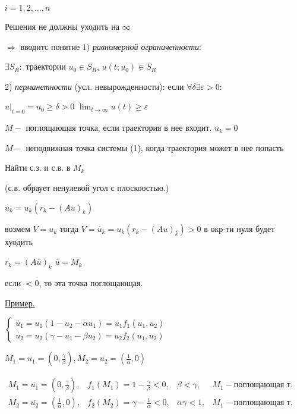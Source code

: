 \documentclass{article}
\begin{document}
\begin{large}
\(
i = 1,2,...,n
\)

\vspace{0.5cm}
Решения не должны уходить на $\infty$ 

$\Rightarrow$ вводитс понятие $1)$ \textit{равномерной ограниченности}:

$\exists S_R : $ траектории $u_0 \in S_R$, \hspace{0.2cm} $u(t;u_0) \in S_R$

2) \textit{перманетности} (усл. невырожденности): если $\forall\delta \exists\varepsilon > 0:$

$u|_{t=0} = u_0 \geq \delta > 0$ \hspace{0.2cm} $\lim_{t \to \infty} u(t) \geq\varepsilon$

\vspace{0.5cm}
$M - $ поглощающая точка, если траектория в нее входит. $u_k=0$

$M -$ неподвижная точка системы (1), когда траектория может в нее попасть

Найти с.з. и с.в. в $M_k$

(с.в. обраует ненулевой угол с плоскоостью.)


$\dot{u_k} = u_k(r_k - (Au)_k)$

возмем $ V = u_k$
тогда $ \dot{V} = \dot{u_k} = u_k(r_k - (Au)_k) > 0$\hspace{0.2cm} в окр-ти нуля будет хуодить

$r_k = (A\overline{u})_k$ \hspace{0.2cm} $\overline{u} = M_k$

если $<0$, то эта точка поглощающая.

\underline{Пример.}

\vspace{0.5cm}
\(
	\begin{cases}
	\dot{u_1} = u_1(1-u_2-\alpha u_1) = u_1 f_1(u_1,u_2)
	\\
	\dot{u_2} = u_2(\gamma - u_1 - \beta u_2) = u_2f_2(u_1,u_2)
	\end{cases}
\)

\newpage
$M_1 = \overline{u_1} = (0 , \frac{\gamma}{\beta}),$\hspace{0.2cm}$M_2 = \overline{u_2} = (\frac{1}{\alpha} , 0)$

\vspace{0.5cm}
$
	\begin{matrix}
	M_1 = \overline{u_1} = (0 , \frac{\gamma}{\beta}), & f_1(M_1) = 1 - \frac{\gamma}{\beta} < 0,&\beta < \gamma,  & M_1- {\text {поглощающая т.}}\\
	M_2 = \overline{u_2} = (\frac{1}{\alpha} , 0), & f_2(M_2) = \gamma - \frac{1}{\alpha}<0,&\alpha\gamma < 1, & M_1- {\text {поглощающая т.}}
	\end{matrix}
$



\end{large}
\end{document}
